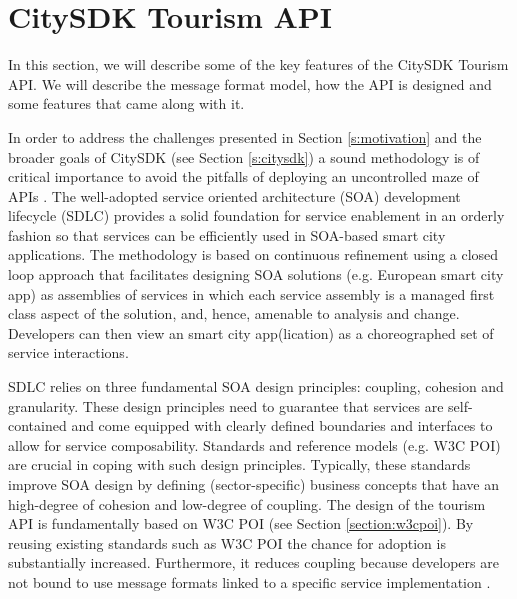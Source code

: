 \documentclass[times]{ettauth}
\begin{document}
\section{CitySDK Tourism API}
\label{s:tourim-api}
In this section, we will describe some of the key features of the CitySDK Tourism API. We will describe the message format model, how the API is designed and some features that came along with it.

In order to address the challenges presented in Section \ref{s:motivation} and the broader goals of CitySDK (see Section \ref{s:citysdk}) a sound methodology is of critical importance to avoid the pitfalls of deploying an uncontrolled maze of APIs \cite{papazoglou2007,monsieur2012}.
The well-adopted service oriented architecture (SOA) development lifecycle (SDLC) \cite{papazoglou2007} provides a solid foundation for service enablement in an orderly fashion so that services can be efficiently used in SOA-based smart city applications.
The methodology is based on continuous refinement using a closed loop approach that facilitates designing SOA solutions (e.g. European smart city app) as assemblies of services in which each service assembly is a managed first class aspect of the solution, and, hence, amenable to analysis and change. Developers can then view an smart city app(lication) as a choreographed set of service interactions.

SDLC relies on three fundamental SOA design principles: coupling, cohesion and granularity. These design principles need to guarantee that services are self-contained and come equipped with clearly defined boundaries and interfaces to allow for service composability.
Standards and reference models (e.g. W3C POI) are crucial in coping with such design principles. Typically, these standards improve SOA design by defining (sector-specific) business concepts that have an high-degree of cohesion and low-degree of coupling.
The design of the tourism API is fundamentally based on W3C POI (see Section \ref{section:w3cpoi}).
By reusing existing standards such as W3C POI the chance for adoption is substantially increased. Furthermore, it reduces coupling because developers are not bound to use message formats linked to a specific service implementation \cite{papazoglou2007}.
\end{document}
